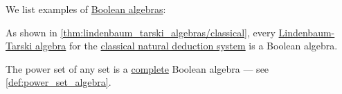 \begin{example}\label{ex:def:boolean_algebra}
  We list examples of \hyperref[def:boolean_algebra]{Boolean algebras}:

  \begin{thmenum}
     As shown in \cref{thm:lindenbaum_tarski_algebras/classical}, every \hyperref[def:lindenbaum_tarski_algebra]{Lindenbaum-Tarski algebra} for the \hyperref[def:propositional_natural_deduction]{classical natural deduction system} is a Boolean algebra.

     The power set of any set is a \hyperref[def:complete_lattice]{complete} Boolean algebra --- see \cref{def:power_set_algebra}.
  \end{thmenum}
\end{example}

